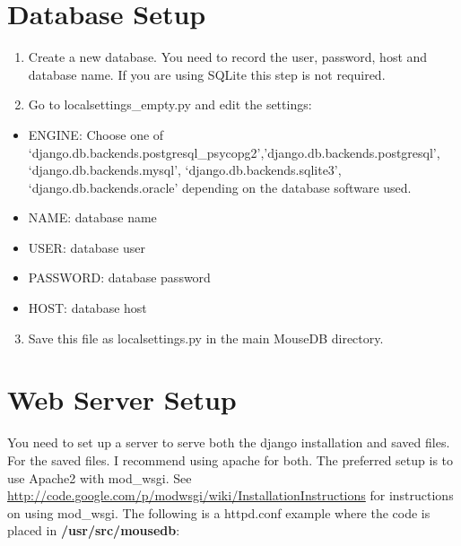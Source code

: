 \documentclass[letterpaper,10pt,english]{sphinxmanual}
\begin{document}
\section{Database Setup}
\label{installation:database-setup}\begin{enumerate}
\item {} 
Create a new database.  You need to record the user, password, host and database name.  If you are using SQLite this step is not required.

\item {} 
Go to localsettings\_empty.py and edit the settings:

\end{enumerate}
\begin{itemize}
\item {} 
ENGINE: Choose one of `django.db.backends.postgresql\_psycopg2','django.db.backends.postgresql', `django.db.backends.mysql', `django.db.backends.sqlite3', `django.db.backends.oracle' depending on the database software used.

\item {} 
NAME: database name

\item {} 
USER: database user

\item {} 
PASSWORD: database password

\item {} 
HOST: database host

\end{itemize}
\begin{enumerate}
\setcounter{enumi}{2}
\item {} 
Save this file as localsettings.py in the main MouseDB directory.

\end{enumerate}


\section{Web Server Setup}
\label{installation:web-server-setup}
You need to set up a server to serve both the django installation and saved files.  For the saved files.  I recommend using apache for both.  The preferred setup is to use Apache2 with mod\_wsgi.  See \href{http://code.google.com/p/modwsgi/wiki/InstallationInstructions}{http://code.google.com/p/modwsgi/wiki/InstallationInstructions} for instructions on using mod\_wsgi.  The following is a httpd.conf example where the code is placed in \textbf{/usr/src/mousedb}:
\end{document}
